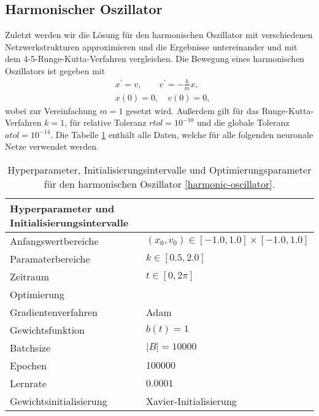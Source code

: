 \subsection{Harmonischer Oszillator}
\label{sec:harmonischer-oszillator}
Zuletzt werden wir die Lösung für den harmonischen Oszillator mit verschiedenen Netzwerkstrukturen approximieren und
die Ergebnisse untereinander und mit dem 4-5-Runge-Kutta-Verfahren vergleichen. Die Bewegung eines harmonischen
Oszillators ist gegeben mit
\begin{align}
       \label{harmonic-oscillator}
       &x^{\prime}=v, \qquad v^{\prime}=-\frac{k}{m}x, \\
       &x(0)=0, \quad v(0)=0, \nonumber
\end{align}
wobei zur Vereinfachung $m=1$ gesetzt wird. Außerdem gilt für das Runge-Kutta-Verfahren $k=1$, für relative Toleranz
$rtol = 10^{-10}$ und die globale Toleranz $atol = 10^{-14}$. Die Tabelle \ref{stiff-table-data} enthält alle Daten,
welche für alle folgenden neuronale Netze verwendet werden.
\begin{table}
       \renewcommand{\arraystretch}{1.0}
       \centering
       \begin{tabular}{ l | l }
              \hline
              Hyperparameter und Initialisierungsintervalle & \\
              \hline
              Anfangswertbereiche &
              $(x_{0},v_0) \in [-1.0, 1.0] \times [-1.0, 1.0]$ \\
              Paramaterbereiche & $k \in [0.5, 2.0]$ \\
              Zeitraum & $t \in [0, 2\pi]$ \\
              \hline
              Optimierung & \\
              \hline
              Gradientenverfahren & Adam \\
              Gewichtsfunktion & $b(t)=1$ \\
              Batchsize & $|B|=10000$ \\
              Epochen & $100000$ \\
              Lernrate & $0.0001$ \\
              Gewichtsinitialisierung & Xavier-Initialisierung \\
              \hline
       \end{tabular}
       \caption{Hyperparameter, Initialisierungsintervalle und Optimierungsparameter für den harmonischen Oszillator
       \eqref{harmonic-oscillator}.}
       \label{stiff-table-data}
\end{table}
